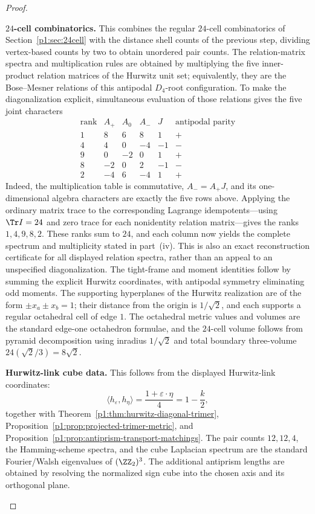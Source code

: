 \documentclass[11pt]{article}
\begin{document}
\begin{proof}
\begin{proofsteps}[label=\textbf{(\roman*)}]
\item \textbf{\(24\)-cell combinatorics.}
This combines the regular \(24\)-cell combinatorics of
Section~\ref{p1:sec:24cell} with the distance shell counts of the previous step,
dividing vertex-based counts by two to obtain unordered pair counts. The
relation-matrix spectra and multiplication rules are obtained by multiplying the
five inner-product relation matrices of the Hurwitz unit set; equivalently, they
are the Bose--Mesner relations of this antipodal \(D_4\)-root configuration.
To make the diagonalization explicit, simultaneous evaluation of those
relations gives the five joint characters
\[
\begin{array}{c|rrrr|c}
\text{rank}&A_+&A_0&A_-&J&\text{antipodal parity}\\
\hline
1&8&6&8&1&+\\
4&4&0&-4&-1&-\\
9&0&-2&0&1&+\\
8&-2&0&2&-1&-\\
2&-4&6&-4&1&+
\end{array}
\]
Indeed, the multiplication table is commutative, \(A_- = A_+J\), and its
one-dimensional algebra characters are exactly the five rows above.
Applying the ordinary matrix trace to the corresponding Lagrange
idempotents---using
\(\Tr I=24\) and zero trace for each nonidentity relation
matrix---gives the ranks \(1,4,9,8,2\).  These ranks sum to \(24\), and each
column now yields the complete spectrum and multiplicity stated in
part~\textup{(iv)}.  This is also an exact reconstruction certificate for
all displayed relation spectra, rather than an appeal to an unspecified
diagonalization.
The tight-frame and moment identities follow by summing the explicit Hurwitz
coordinates, with antipodal symmetry eliminating odd moments. The supporting
hyperplanes of the Hurwitz realization are of the form \(\pm x_a\pm x_b=1\);
their distance from the origin is \(1/\sqrt2\), and each supports a regular
octahedral cell of edge \(1\). The octahedral metric values and volumes are the
standard edge-one octahedron formulae, and the \(24\)-cell volume follows from
pyramid decomposition using inradius \(1/\sqrt2\) and total boundary
three-volume \(24(\sqrt2/3)=8\sqrt2\).

\item \textbf{Hurwitz-link cube data.}
This follows from the displayed Hurwitz-link coordinates:
\[
\langle h_\varepsilon,h_\eta\rangle
 =\frac{1+\varepsilon\cdot\eta}{4}
 =1-\frac{k}{2},
\]
together with Theorem~\ref{p1:thm:hurwitz-diagonal-trimer},
Proposition~\ref{p1:prop:projected-trimer-metric}, and
Proposition~\ref{p1:prop:antiprism-transport-matchings}. The pair counts
\(12,12,4\), the Hamming-scheme spectra, and the cube Laplacian spectrum are the
standard Fourier/Walsh eigenvalues of \((\ZZ_2)^3\). The additional antiprism
lengths are obtained by resolving the normalized sign cube into the chosen axis
and its orthogonal plane.


\end{proofsteps}
\end{proof}
\end{document}
